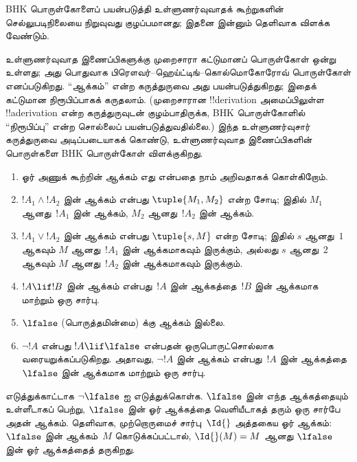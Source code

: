 \documentclass[../../../include/open-logic-section]{subfiles}
\begin{document}


\begin{editorial}
  BHK பொருள்கோளைப் பயன்படுத்தி உள்ளுணர்வுவாதக் கூற்றுகளின்
  செல்லுபடிநிலையை நிறுவுவது குழப்பமானது; இதனை இன்னும் தெளிவாக விளக்க
  வேண்டும்.
\end{editorial}

உள்ளுணர்வுவாத இணைப்பிகளுக்கு முறைசாரா கட்டுமானப் பொருள்கோள் ஒன்று உள்ளது;
அது பொதுவாக பிரௌவர்--ஹெய்ட்டிங்--கொல்மொகோரோவ் பொருள்கோள் எனப்படுகிறது.
``ஆக்கம்'' என்ற கருத்துருவை அது பயன்படுத்துகிறது; இதைக் கட்டுமான
நிரூபிப்பாகக் கருதலாம். (முறைசாரான !!{derivation} அமைப்பிலுள்ள
!!a{derivation} என்ற கருத்துருவுடன் குழம்பாதிருக்க, BHK பொருள்கோளில்
``நிரூபிப்பு'' என்ற சொல்லைப் பயன்படுத்துவதில்லை.) இந்த உள்ளுணர்வுசார்
கருத்துருவை அடிப்படையாகக் கொண்டு, உள்ளுணர்வுவாத இணைப்பிகளின் பொருள்களை BHK
பொருள்கோள் விளக்குகிறது.

\begin{enumerate}
\item ஓர் அணுக் கூற்றின் ஆக்கம் எது என்பதை நாம் அறிவதாகக் கொள்கிறோம்.
\item $!A_1 \land !A_2$ இன் ஆக்கம் என்பது $\tuple{M_1, M_2}$ என்ற சோடி;
  இதில் $M_1$ ஆனது~$!A_1$ இன் ஆக்கம், $M_2$ ஆனது~$!A_2$ இன் ஆக்கம்.
\item $!A_1 \lor !A_2$ இன் ஆக்கம் என்பது $\tuple{s, M}$ என்ற சோடி;
  இதில் $s$ ஆனது~$1$ ஆகவும் $M$ ஆனது~$!A_1$ இன் ஆக்கமாகவும் இருக்கும்,
  அல்லது $s$ ஆனது~$2$ ஆகவும் $M$ ஆனது~$!A_2$ இன் ஆக்கமாகவும் இருக்கும்.
\item $!A \lif !B$ இன் ஆக்கம் என்பது~$!A$ இன் ஆக்கத்தை~$!B$ இன்
  ஆக்கமாக மாற்றும் ஒரு சார்பு.
\item $\lfalse$ (பொருத்தமின்மை) க்கு ஆக்கம் இல்லை.
\item $\lnot !A$ என்பது $!A \lif \lfalse$ என்பதன் ஒருபொருட்சொல்லாக
  வரையறுக்கப்படுகிறது. அதாவது, $\lnot !A$ இன் ஆக்கம் என்பது~$!A$ இன்
  ஆக்கத்தை~$\lfalse$ இன் ஆக்கமாக மாற்றும் ஒரு சார்பு.
\end{enumerate}

\begin{ex}
எடுத்துக்காட்டாக $\lnot \lfalse$ ஐ எடுத்துக்கொள்க. $\lfalse$ இன் எந்த
ஆக்கத்தையும் உள்ளீடாகப் பெற்று, $\lfalse$ இன் ஓர் ஆக்கத்தை வெளியீடாகத் தரும்
ஒரு சார்பே அதன் ஆக்கம். தெளிவாக, முற்றொருமைச் சார்பு~$\Id{}$ அத்தகைய ஓர்
ஆக்கம்: $\lfalse$ இன் ஆக்கம்~$M$ கொடுக்கப்பட்டால், $\Id{}(M) = M$ ஆனது
$\lfalse$ இன் ஓர் ஆக்கத்தைத் தருகிறது.
\end{ex}
\end{document}
